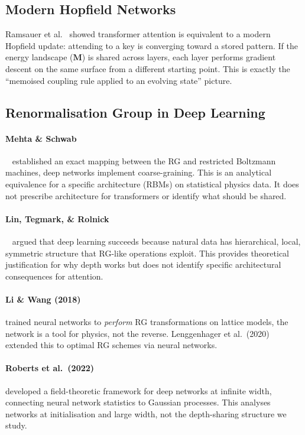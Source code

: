 \documentclass[11pt, a4paper]{article}
\newcommand{\M}{\mathbf{M}}
\theoremstyle{remark}
\begin{document}
\subsection{Modern Hopfield Networks}

Ramsauer et al.~\cite{ramsauer2021hopfield} showed transformer attention is equivalent to a modern Hopfield update: attending to a key is converging toward a stored pattern.
If the energy landscape ($\M$) is shared across layers, each layer performs gradient descent on the same surface from a different starting point.
This is exactly the ``memoised coupling rule applied to an evolving state'' picture.

\subsection{Renormalisation Group in Deep Learning}

\paragraph{Mehta \& Schwab}~\cite{mehta2014exact} established an exact mapping between the RG and restricted Boltzmann machines, deep networks implement coarse-graining.
This is an analytical equivalence for a specific architecture (RBMs) on statistical physics data.
It does not prescribe architecture for transformers or identify what should be shared.

\paragraph{Lin, Tegmark, \& Rolnick}~\cite{lin2017does} argued that deep learning succeeds because natural data has hierarchical, local, symmetric structure that RG-like operations exploit.
This provides theoretical justification for why depth works but does not identify specific architectural consequences for attention.

\paragraph{Li \& Wang (2018)} trained neural networks to \emph{perform} RG transformations on lattice models, the network is a tool for physics, not the reverse.
Lenggenhager et al.\ (2020) extended this to optimal RG schemes via neural networks.

\paragraph{Roberts et al.\ (2022)} developed a field-theoretic framework for deep networks at infinite width, connecting neural network statistics to Gaussian processes.
This analyses networks at initialisation and large width, not the depth-sharing structure we study.
\end{document}
